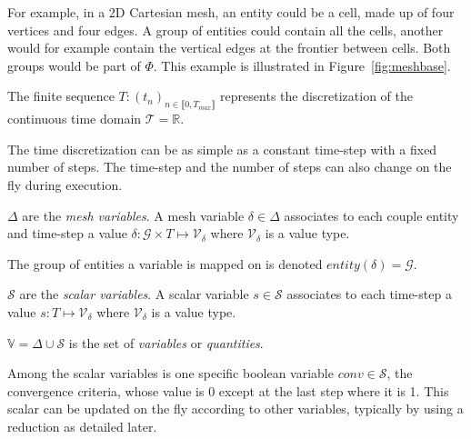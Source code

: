 For example, in a 2D Cartesian mesh, an entity could be a cell, made up of four vertices and four edges.
A group of entities could contain all the cells, another would for example contain the vertical edges at the frontier between cells. Both groups would be part of $\Phi$. This example is illustrated in Figure~\ref{fig:meshbase}.

\medskip

\begin{mydef}
The finite sequence $T: (t_n)_{n\in\llbracket 0, T_{max} \rrbracket}$ represents the discretization of the continuous time domain $\mathcal{T}=\mathbb{R}$.
\end{mydef}

The time discretization can be as simple as a constant time-step with a fixed number of steps.
The time-step and the number of steps can also change on the fly during execution. %

\medskip

\begin{mydefs}
\item $\Delta$ are the \textit{mesh variables}. A mesh variable $\delta \in \Delta$ associates to each couple entity and time-step a value $\delta: \mathcal{G}\times T\mapsto \mathcal{V}_\delta$ where $\mathcal{V}_{\delta}$ is a value type.
\item The group of entities a variable is mapped on is denoted $entity(\delta)=\mathcal{G}$.%
\item $\mathcal{S}$ are the \textit{scalar variables}. A scalar variable $s \in \mathcal{S}$ associates to each time-step a value $s: T\mapsto \mathcal{V}_\delta$ where $\mathcal{V}_{\delta}$ is a value type.
\item $\mathbb{V}=\Delta\cup\mathcal{S}$ is the set of \emph{variables} or \emph{quantities}.
\item Among the scalar variables is one specific boolean variable $conv\in\mathcal{S}$, the convergence criteria, whose value is $0$ except at the last step where it is 1. This scalar can be updated on the fly according to other variables, typically by using a reduction as detailed later.%
\end{mydefs}
%

